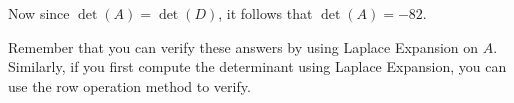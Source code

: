 \begin{solution}
Now since $\det \left(A\right) = \det \left(D\right)$, it follows that $\det \left(A\right) = -82$. 
\end{solution} 

Remember that you can verify these answers by using Laplace Expansion on $A$. 
Similarly, if you first compute the determinant using Laplace Expansion, you can use the row operation
method to verify.
